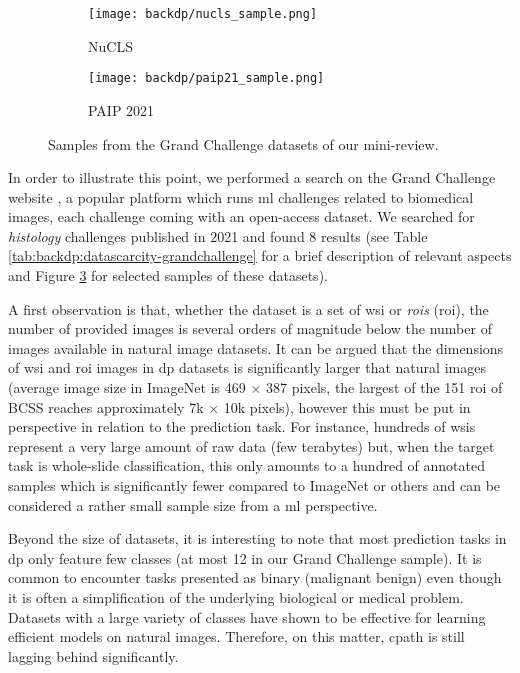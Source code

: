 \begin{figure}
  \begin{subfigure}{0.30\textwidth}
    \centering
    \texttt{[image: backdp/nucls\_sample.png]}
    \caption{NuCLS}
    \label{sfig:backdp:challenge_sample:nucls}
  \end{subfigure}
  \begin{subfigure}{0.48\textwidth}
    \centering
    \texttt{[image: backdp/paip21\_sample.png]}
    \caption{PAIP 2021}
    \label{sfig:backdp:challenge_sample:paip2021}
  \end{subfigure} 
  \caption{Samples from the Grand Challenge datasets of our mini-review.}
  \label{fig:backp:samples_challenges}
\end{figure}

In order to illustrate this point, we performed a search on the Grand Challenge website \cite{grandchallenge}, a popular platform which runs \acrlong{ml} challenges related to biomedical images, each challenge coming with an open-access dataset. We searched for \textit{histology} challenges published in 2021 and found 8 results (see Table \ref{tab:backdp:datascarcity-grandchallenge} for a brief description of relevant aspects and Figure \ref{fig:backp:samples_challenges} for selected samples of these datasets).

A first observation is that, whether the dataset is a set of \acrshort{wsi} or \textit{\acrlong{roi}s} (\acrshort{roi}), the number of provided images is several orders of magnitude below the number of images available in natural image datasets. It can be argued that the dimensions of \acrshort{wsi} and \acrshort{roi} images in \acrlong{dp} datasets is significantly larger that natural images (\eg average image size in ImageNet is 469 $\times$ 387 pixels, the largest of the 151 \acrshort{roi} of BCSS reaches approximately 7k $\times$ 10k pixels), however this must be put in perspective in relation to the prediction task. For instance, hundreds of \acrshort{wsi}s represent a very large amount of raw data (\eg few terabytes) but, when the target task is whole-slide classification, this only amounts to a hundred of annotated samples which is significantly fewer compared to ImageNet or others and can be considered a rather small sample size from a \acrshort{ml} perspective.  

Beyond the size of datasets, it is interesting to note that most prediction tasks in \acrlong{dp} only feature few classes (at most 12 in our Grand Challenge sample). It is common to encounter tasks presented as binary (\eg malignant \vs benign) even though it is often a simplification of the underlying biological or medical problem. Datasets with a large variety of classes have shown to be effective for learning efficient models on natural images. Therefore, on this matter, \acrlong{cpath} is still lagging behind significantly. 

